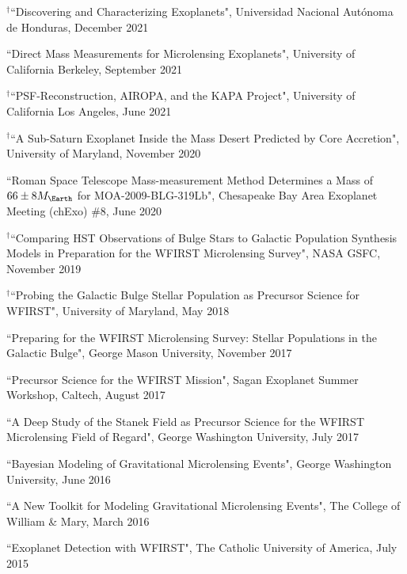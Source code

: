 \documentclass[margin,line]{cv}
\begin{document}
\begin{resume}
\begin{etaremune}
\item $^{\dagger}$``Discovering and Characterizing Exoplanets", Universidad Nacional Autónoma de Honduras, December 2021

\item ``Direct Mass Measurements for Microlensing Exoplanets", University of California Berkeley, September 2021

\item $^{\dagger}$``PSF-Reconstruction, AIROPA, and the KAPA Project", University of California Los Angeles, June 2021

\item $^{\dagger}$``A Sub-Saturn Exoplanet Inside the Mass Desert Predicted by Core Accretion", University of Maryland, November 2020

\item ``Roman Space Telescope Mass-measurement Method Determines a Mass of $66 \pm 8M_{\Earth}$ for MOA-2009-BLG-319Lb", Chesapeake Bay Area Exoplanet Meeting (chExo) \#8, June 2020

\item $^{\dagger}$``Comparing HST Observations of Bulge Stars to Galactic Population Synthesis Models in Preparation for the WFIRST Microlensing Survey", NASA GSFC, November 2019 
\item $^{\dagger}$``Probing the Galactic Bulge Stellar Population as Precursor Science for WFIRST", University of Maryland, May 2018

\item ``Preparing for the WFIRST Microlensing Survey: Stellar Populations in the Galactic Bulge", George Mason University, November 2017

\item ``Precursor Science for the WFIRST Mission", Sagan Exoplanet Summer Workshop, Caltech, August 2017

\item ``A Deep Study of the Stanek Field as Precursor Science for the WFIRST Microlensing Field of Regard", George Washington University, July 2017

\item ``Bayesian Modeling of Gravitational Microlensing Events", George Washington University, June 2016

\item ``A New Toolkit for Modeling Gravitational Microlensing Events", The College of William \& Mary, March 2016

\item ``Exoplanet Detection with WFIRST", The Catholic University of America, July 2015


\end{etaremune}
\end{resume}
\end{document}

